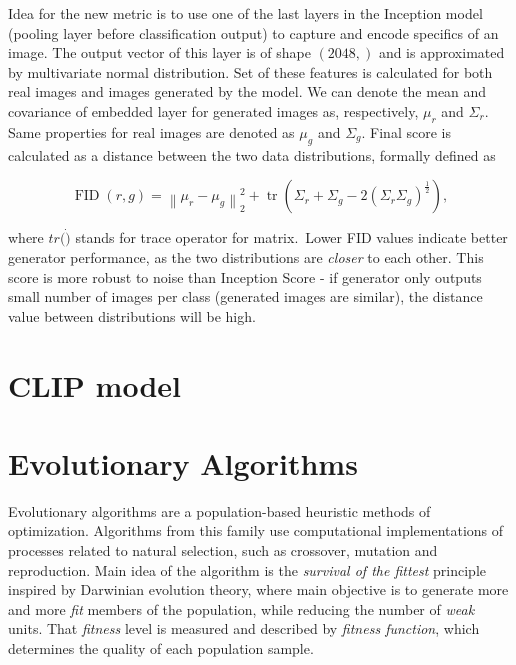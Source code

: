\documentclass[12pt,a4paper,openany]{book}
\begin{document}
Idea for the new metric is to use one of the last layers in the Inception model (pooling layer before classification output) to capture and encode specifics of an image. The output vector of this layer is of shape $(2048,)$ and is approximated by multivariate normal distribution. Set of these features is calculated for both real images and images generated by the model. We can denote the mean and covariance of embedded layer for generated images as, respectively, $\mu_{r}$ and  $\Sigma_{r}$. Same properties for real images are denoted as $\mu_{g}$ and $\Sigma_{g}$. Final score is calculated as a distance between the two data distributions, formally defined as

\begin{equation}
\operatorname{FID}(r, g)=\left\|\mu_{r}-\mu_{g}\right\|_{2}^{2}+\operatorname{tr}\left(\Sigma_{r}+\Sigma_{g}-2\left(\Sigma_{r} \Sigma_{g}\right)^{\frac{1}{2}}\right),
\end{equation}

where $tr(\dot)$ stands for trace operator for matrix.\
Lower FID values indicate better generator performance, as the two distributions are \textit{closer} to each other. This score is more robust to noise than Inception Score - if generator only outputs small number of images per class (generated images are similar), the distance value between distributions will be high.

\section{CLIP model}

%
%


\section{Evolutionary Algorithms}

Evolutionary algorithms are a population-based heuristic methods of optimization. Algorithms from this family use computational implementations of processes related to natural selection, such as crossover, mutation and reproduction. Main idea of the algorithm is the \textit{survival of the fittest} principle inspired by Darwinian evolution theory, where main objective is to generate more and more \textit{fit} members of the population, while reducing the number of \textit{weak} units. That \textit{fitness} level is measured and described by \textit{fitness function}, which determines the quality of each population sample.\
\end{document}
